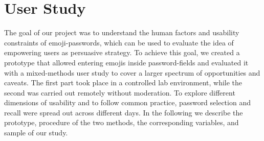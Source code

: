 

\section{User Study}
The goal of our project was to understand the human factors and usability constraints of emoji-passwords, which can be used to evaluate the idea of empowering users as persuasive strategy. To achieve this goal, we created a prototype that allowed entering emojis inside password-fields and evaluated it with a mixed-methods user study to cover a larger spectrum of opportunities and caveats. The first part took place in a controlled lab environment, while the second was carried out remotely without moderation. To explore different dimensions of usability and to follow common practice, password selection and recall were spread out across different days. In the following we describe the prototype, procedure of the two methods, the corresponding variables, and sample of our study. 

